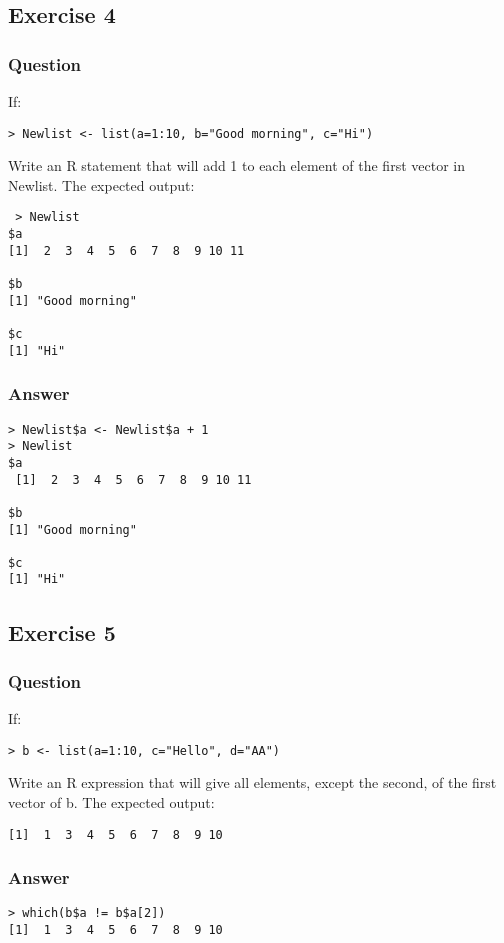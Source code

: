 \documentclass[11pt]{article}
\begin{document}
\subsection{Exercise 4}
\label{sec:orga75d902}
\subsubsection{Question}
\label{sec:orgc5d7393}
If:
\begin{verbatim}
> Newlist <- list(a=1:10, b="Good morning", c="Hi")
\end{verbatim}

Write an R statement that will add 1 to each element of the first vector in Newlist.  The expected output:
\begin{verbatim}
 > Newlist
$a
[1]  2  3  4  5  6  7  8  9 10 11

$b
[1] "Good morning"

$c
[1] "Hi"
\end{verbatim}

\subsubsection{Answer}
\label{sec:org8cad864}
\begin{verbatim}
> Newlist$a <- Newlist$a + 1
> Newlist
$a
 [1]  2  3  4  5  6  7  8  9 10 11

$b
[1] "Good morning"

$c
[1] "Hi"
\end{verbatim}

\subsection{Exercise 5}
\label{sec:org7cee7c2}
\subsubsection{Question}
\label{sec:org82cb37e}
If:
\begin{verbatim}
> b <- list(a=1:10, c="Hello", d="AA")
\end{verbatim}

Write an R expression that will give all elements, except the second, of the first vector of b.  The expected output:
\begin{verbatim}
[1]  1  3  4  5  6  7  8  9 10
\end{verbatim}

\subsubsection{Answer}
\label{sec:org51245df}
\begin{verbatim}
> which(b$a != b$a[2])
[1]  1  3  4  5  6  7  8  9 10
\end{verbatim}
\end{document}
